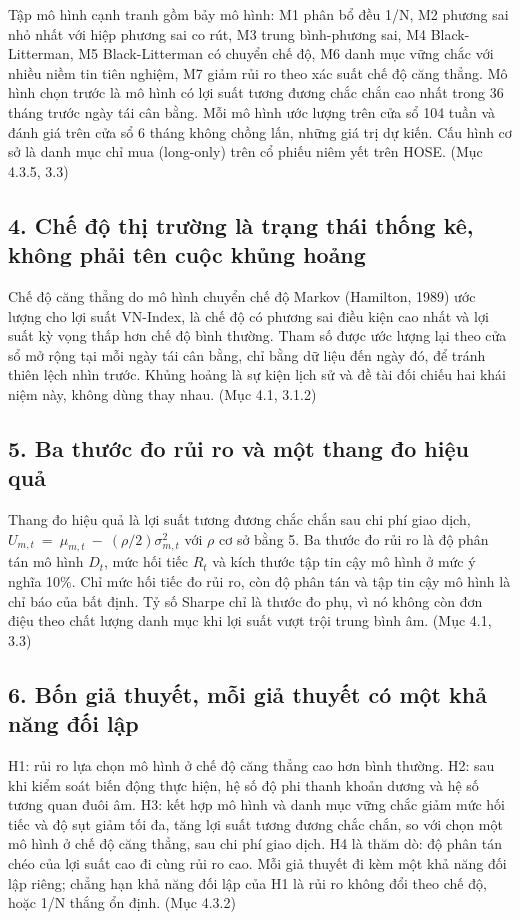 Tập mô hình cạnh tranh gồm bảy mô hình: M1 phân bổ đều 1/N, M2 phương sai nhỏ nhất với hiệp phương sai co rút, M3 trung bình-phương sai, M4 Black-Litterman, M5 Black-Litterman có chuyển chế độ, M6 danh mục vững chắc với nhiều niềm tin tiên nghiệm, M7 giảm rủi ro theo xác suất chế độ căng thẳng. Mô hình chọn trước là mô hình có lợi suất tương đương chắc chắn cao nhất trong 36 tháng trước ngày tái cân bằng. Mỗi mô hình ước lượng trên cửa sổ 104 tuần và đánh giá trên cửa sổ 6 tháng không chồng lấn, những giá trị dự kiến. Cấu hình cơ sở là danh mục chỉ mua (long-only) trên cổ phiếu niêm yết trên HOSE. (Mục 4.3.5, 3.3)

\subsection{4. Chế độ thị trường là trạng thái thống kê, không phải tên cuộc khủng hoảng}

Chế độ căng thẳng do mô hình chuyển chế độ Markov (Hamilton, 1989) ước lượng cho lợi suất VN-Index, là chế độ có phương sai điều kiện cao nhất và lợi suất kỳ vọng thấp hơn chế độ bình thường. Tham số được ước lượng lại theo cửa sổ mở rộng tại mỗi ngày tái cân bằng, chỉ bằng dữ liệu đến ngày đó, để tránh thiên lệch nhìn trước. Khủng hoảng là sự kiện lịch sử và đề tài đối chiếu hai khái niệm này, không dùng thay nhau. (Mục 4.1, 3.1.2)

\subsection{5. Ba thước đo rủi ro và một thang đo hiệu quả}

Thang đo hiệu quả là lợi suất tương đương chắc chắn sau chi phí giao dịch, \(U_{m,t}\  = \ \mu_{m,t}\  - \ (\rho/2)\sigma_{m,t}^{2}\) với \(\rho\) cơ sở bằng 5. Ba thước đo rủi ro là độ phân tán mô hình \(D_{t}\), mức hối tiếc \(R_{t}\) và kích thước tập tin cậy mô hình ở mức ý nghĩa 10\%. Chỉ mức hối tiếc đo rủi ro, còn độ phân tán và tập tin cậy mô hình là chỉ báo của bất định. Tỷ số Sharpe chỉ là thước đo phụ, vì nó không còn đơn điệu theo chất lượng danh mục khi lợi suất vượt trội trung bình âm. (Mục 4.1, 3.3)

\subsection{6. Bốn giả thuyết, mỗi giả thuyết có một khả năng đối lập}

H1: rủi ro lựa chọn mô hình ở chế độ căng thẳng cao hơn bình thường. H2: sau khi kiểm soát biến động thực hiện, hệ số độ phi thanh khoản dương và hệ số tương quan đuôi âm. H3: kết hợp mô hình và danh mục vững chắc giảm mức hối tiếc và độ sụt giảm tối đa, tăng lợi suất tương đương chắc chắn, so với chọn một mô hình ở chế độ căng thẳng, sau chi phí giao dịch. H4 là thăm dò: độ phân tán chéo của lợi suất cao đi cùng rủi ro cao. Mỗi giả thuyết đi kèm một khả năng đối lập riêng; chẳng hạn khả năng đối lập của H1 là rủi ro không đổi theo chế độ, hoặc 1/N thắng ổn định. (Mục 4.3.2)

